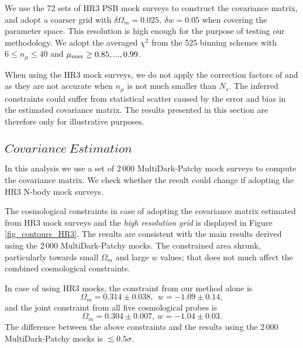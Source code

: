 \documentclass[iop]{emulateapj}
\begin{document}
We use the 72 sets of HR3 PSB mock surveys to construct the covariance matrix,
and adopt a coarser grid with $\delta \Omega_m=0.025,\ \delta w=0.05$ when covering the parameter space.
This resolution is high enough for the purpose of testing our methodology.
We adopt the averaged $\chi^2$ from the 525 binning schemes
with $6\leq n_\mu \leq 40$ and $\mu_{\rm max} \geq 0.85, ..., 0.99$.

When using the HR3 mock surveys, we do not apply the correction factors of \cite{Hartlap} and \cite{Percival2014}
as they are not accurate when $n_\mu$ is not much smaller than $N_s$.
The inferred constraints could suffer from statistical scatter caused by the error and bias in the estimated covariance matrix.
The results presented in this section are therefore only for illustrative purposes.


\subsection{$Covariance\ Estimation$}

In this analysis we use a set of 2\,000 MultiDark-Patchy mock surveys to compute the covariance matrix.
We check whether the result could change if adopting the HR3 N-body mock surveys.

The cosmological constraints in case of adopting the covariance matrix estimated from HR3 mock surveys
and the {\it high resolution grid} is displayed in Figure \ref{fig_contours_HR3}.
The results are consistent with the main results derived using the 2\,000 MultiDark-Patchy mocks.
The constrained area shrunk, particularly towards small $\Omega_m$ and large $w$ values;
that does not much affect the combined cosmological constraints.

In case of using HR3 mocks, the constraint from our method alone is
\begin{equation}
 \Omega_m=0.314 \pm 0.038,\ \ w = -1.09 \pm 0.14,
\end{equation}
and the joint constraint from all five cosmological probes is
\begin{equation}
 \Omega_m = 0.304 \pm 0.007,\ w=-1.04 \pm 0.03.
\end{equation}
The difference between the above constraints and the results using the 2\,000 MultiDark-Patchy mocks is $\lesssim0.5\sigma$.
\end{document}
